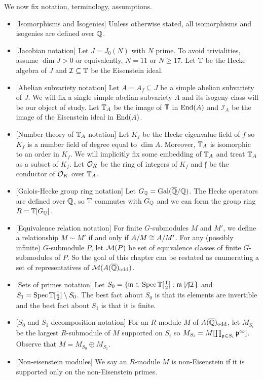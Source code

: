 \documentclass{article}
\newcommand{\I}{\mathcal{I}}
\newcommand{\odd}{\mathrm{odd}}
\begin{document}
We now fix notation, terminology, assumptions.
\begin{itemize}
    \item{} [Isomorphisms and Isogenies]
        Unless otherwise stated, all isomorphisms and isogenies are defined
        over $\mathbb{Q}$.
    \item{} [Jacobian notation]
        Let $J = J_0(N)$ with $N$ prime. To avoid trivialities, assume $\dim
        J>0$ or equivalently, $N=11$ or $N\geq 17$. Let $\mathbb{T}$ be the Hecke
        algebra of $J$ and $\I\subseteq \TT$ be the Eisenstein ideal.
    \item{} [Abelian subvariety notation]
        Let $A=A_f\subseteq J$ be a simple abelian subvariety of $J$. We will
        fix a single simple abelian subvariety $A$ and its isogeny class will
        be our object of study. Let $\mathbb{T}_A$ be the image of $\mathbb{T}$ in $\operatorname{End}(A)$
        and $\I_A$ be the image of the Eisenstein ideal in $\operatorname{End}(A)$. 
    \item{} [Number theory of $\mathbb{T}_A$ notation] 
        Let $K_f$ be the Hecke eigenvalue field of $f$ so $K_f$ is a number
        field of degree equal to $\dim A$. Moreover, $\mathbb{T}_A$ is isomorphic to
        an order in $K_f$. We will implicitly fix some embedding of $\mathbb{T}_A$ and
        treat $\mathbb{T}_A$ as a subset of $K_f$. Let $\mathcal{O}_K$ be the ring of integers
        of $K_f$ and $\mathfrak{f}$ be the conductor of $\mathcal{O}_K$ over $\mathbb{T}_A$.
    \item{} [Galois-Hecke group ring notation]
        Let $G_{\mathbb{Q}}=\operatorname{Gal}(\overline{\mathbb{Q}}/\mathbb{Q})$. The Hecke operators are defined over
        $\mathbb{Q}$, so $\mathbb{T}$ commutes with $G_{\mathbb{Q}}$ and we can form the group ring
        $R=\mathbb{T}[G_{\mathbb{Q}}]$.
    \item{} [Equivalence relation notation]
        For finite $G$-submodules $M$ and $M'$, we define a relationship $M\sim
        M'$ if and only if $A/M \cong A/M'$. For any (possibly infinite)
        $G$-submodule $P$, let $\mathcal{M}(P)$ be set of equivalence classes of
        finite $G$-submodules of $P$. So the goal of this chapter can be
        restated as enumerating a set of representatives of
        $\M(A(\QQbar)_\odd)$.
    \item{} [Sets of primes notation]
        Let $S_0=\{\mathfrak{m}\in \operatorname{Spec}\mathbb{T}[\frac 12]: \mathfrak{m} \not\mid
        \mathfrak{f}\mathcal{I}\}$ and $S_1 = \operatorname{Spec}\mathbb{T}[\frac 12]\setminus S_0$.
        The best fact about $S_0$ is that its elements are invertible and the
        best fact about $S_1$ is that it is finite.
    \item{} [$S_0$ and $S_1$ decomposition notation]
        For an $R$-module $M$ of $A(\QQbar)_\odd$, let $M_{S_i}$ be the largest
        $R$-submodule of $M$ supported on $S_i$ so $M_{S_i}=M[\prod_{\mathfrak{p}\in S_i}
        \mathfrak{p}^\infty]$. Observe that $M = M_{S_0}\oplus M_{S_1}$.
    \item{} [Non-eisenstein modules]
        We say an $R$-module $M$ is non-Eisenstein if it is supported only on
        the non-Eisenstein primes.
\end{itemize}
\end{document}
